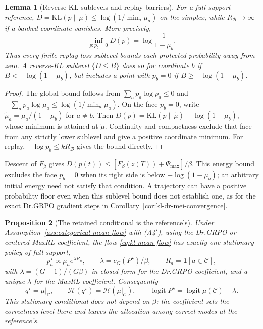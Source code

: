 \documentclass{article}
\newcommand{\enforcehalffinalproseline}{%
  \setlength{\parfillskip}{0pt plus .20\linewidth}}
\newcommand{\1}{\mathbf 1}
\newtheorem{lemma}{Lemma}[section]
\newtheorem{proposition}[lemma]{Proposition}
\theoremstyle{remark}
\theoremstyle{definition}
\theoremstyle{plain}
\begin{document}
\begin{lemma}[Reverse-KL sublevels and replay barriers]
\enforcehalffinalproseline
\label{lem:kl-no-barrier}
For a full-support reference,
$D=\mathrm{KL}(p\|\mu)\le\log(1/\min_a\mu_a)$ on the simplex, while
$R_{\mathcal B}\to\infty$ if a banked coordinate vanishes. More precisely,
\[
 \inf_{p:p_b=0}D(p)=\log\frac1{1-\mu_b}.
\]
Thus every finite replay-loss sublevel bounds each protected probability
away from zero. A reverse-KL sublevel $\{D\le B\}$ does so for coordinate $b$
if $B<-\log(1-\mu_b)$, but includes a point with $p_b=0$ if
$B\ge-\log(1-\mu_b)$.
\end{lemma}
\begin{proof}
\enforcehalffinalproseline
The global bound follows from $\sum_ap_a\log p_a\le0$ and
$-\sum_ap_a\log\mu_a\le\log(1/\min_a\mu_a)$.
On the face $p_b=0$, write $\widetilde\mu_a=\mu_a/(1-\mu_b)$ for $a\ne b$.
Then $D(p)=\mathrm{KL}(p\|\widetilde\mu)-\log(1-\mu_b)$, whose minimum is
attained at $\widetilde\mu$. Continuity and compactness exclude that face
from any strictly lower sublevel and give a positive coordinate minimum.
For replay, $-\log p_b\le kR_{\mathcal B}$ gives the bound directly.
\end{proof}

Descent of $F_\beta$ gives
$D(p(t))\le [F_\beta(z(T))+\Psi_{\max}]/\beta$.
This energy bound excludes the face $p_b=0$ when its right side is below
$-\log(1-\mu_b)$; an arbitrary initial energy need not satisfy that condition.
A trajectory can have a positive probability floor even when this sublevel
bound does not establish one, as for the exact Dr.GRPO gradient steps in
Corollary~\ref{cor:kl-dr-mei-convergence}.

\begin{proposition}[The retained conditional is the reference's]
\enforcehalffinalproseline
\label{prop:kl-stationary}
Under Assumption~\ref{ass:categorical-mean-flow} with (A4$'$), using the
Dr.GRPO or centered MaxRL coefficient, the flow
\eqref{eq:kl-mean-flow} has exactly one stationary policy of full support,
\[
  p^\star_a\propto\mu_ae^{\lambda R_a},
  \qquad
  \lambda=c_G(P^\star)/\beta,
  \qquad
  R_a=\1[a\in\mathcal C],
\]
with $\lambda=(G-1)/(G\beta)$ in closed form for the Dr.GRPO coefficient, and
a unique $\lambda$ for the MaxRL coefficient. Consequently
\[
  q^\star=\mu|_{\mathcal C},
  \qquad
  \mathcal H(q^\star)=\mathcal H(\mu|_{\mathcal C}),
  \qquad
  \operatorname{logit}P^\star=\operatorname{logit}\mu(\mathcal C)+\lambda .
\]
This stationary conditional does not depend on $\beta$: the coefficient sets
the correctness level there and leaves the allocation among correct modes at
the reference's.
\end{proposition}
\end{document}
